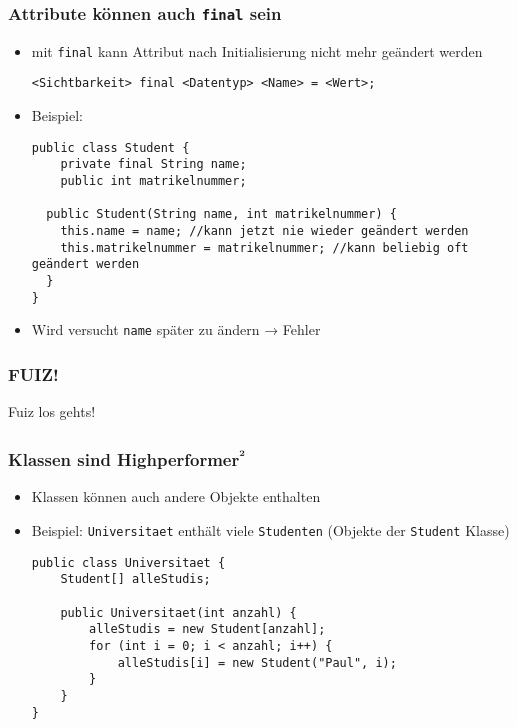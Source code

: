 \documentclass{../../presentation}
\begin{document}
\begin{frame}[fragile]
	\frametitle{Attribute können auch \texttt{final} sein}

	\begin{itemize}
		\item<2-> mit \texttt{final} kann Attribut nach Initialisierung nicht mehr geändert werden
		      \begin{verbatim}
<Sichtbarkeit> final <Datentyp> <Name> = <Wert>;
		\end{verbatim}
		\item<3-> Beispiel:
		      \begin{verbatim}
public class Student {
    private final String name;
    public int matrikelnummer;
    
  public Student(String name, int matrikelnummer) {
    this.name = name; //kann jetzt nie wieder geändert werden
    this.matrikelnummer = matrikelnummer; //kann beliebig oft geändert werden
  }
}
\end{verbatim}

		\item<4-> Wird versucht \texttt{name} später zu ändern → \alert{Fehler}
	\end{itemize}

\end{frame}

\begin{frame}
	\frametitle{FUIZ!}
	\begin{center}
		Fuiz los gehts!
	\end{center} 
\end{frame}

\begin{frame}[fragile]
	\frametitle{Klassen sind Highperformer\textsuperscript{²}}
	\pause
	\begin{itemize}
		\item Klassen können auch andere Objekte enthalten
		      \pause
		\item Beispiel: \texttt{Universitaet} enthält viele \texttt{Studenten} (Objekte der \texttt{Student} Klasse)
		      \pause
		      \begin{verbatim}
public class Universitaet {
    Student[] alleStudis;

    public Universitaet(int anzahl) {
        alleStudis = new Student[anzahl];
        for (int i = 0; i < anzahl; i++) {
            alleStudis[i] = new Student("Paul", i);
        }
    }
}
\end{verbatim}
	\end{itemize}
\end{frame}
\end{document}
